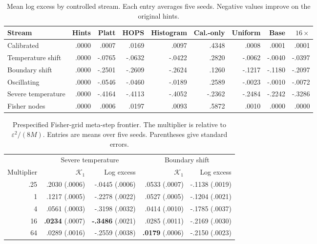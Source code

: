\documentclass{article}
\newcommand{\calK}{\mathcal{K}}
\begin{document}
\begin{table}[h]
\centering
\caption{Mean log excess by controlled stream. Each entry averages five
seeds. Negative values improve on the original hints.}
\label{tab:synthetic-excess-full}
\scriptsize
\begin{tabular}{lrrrrrrrr}
\toprule
Stream & Hints & Platt & HOPS & Histogram & Cal.-only & Uniform & Base & $16\times$\\
\midrule
Calibrated & .0000 & .0007 & .0169 & .0097 & .4348 & .0008 & .0001 & .0001\\
Temperature shift & .0000 & -.0765 & -.0632 & -.0422 & .2820 & -.0062 & -.0040 & -.0397\\
Boundary shift & .0000 & -.2501 & -.2609 & -.2624 & .1260 & -.1217 & -.1180 & -.2097\\
Oscillating & .0000 & -.0546 & -.0460 & -.0189 & .2589 & -.0023 & -.0010 & -.0072\\
Severe temperature & .0000 & -.4164 & -.4113 & -.4052 & -.2362 & -.2484 & -.2242 & -.3286\\
Fisher nodes & .0000 & .0006 & .0197 & .0093 & .5872 & .0010 & .0000 & .0000\\
\bottomrule
\end{tabular}
\end{table}

\begin{table}[h]
\centering
\caption{Prespecified Fisher-grid meta-step frontier. The multiplier is
relative to $\varepsilon^2/(8M)$. Entries are means over five seeds. Parentheses give standard errors.}
\label{tab:frontier}
\scriptsize
\begin{tabular}{rrrrr}
\toprule
& \multicolumn{2}{c}{Severe temperature}
& \multicolumn{2}{c}{Boundary shift}\\
\cmidrule(lr){2-3}\cmidrule(lr){4-5}
Multiplier & $\calK_1$ & Log excess & $\calK_1$ & Log excess\\
\midrule
.25 & .2030 (.0006) & -.0445 (.0006) & .0533 (.0007) & -.1138 (.0019)\\
1 & .1217 (.0005) & -.2278 (.0022) & .0527 (.0005) & -.1204 (.0021)\\
4 & .0561 (.0003) & -.3198 (.0032) & .0414 (.0010) & -.1785 (.0037)\\
16 & \textbf{.0234} (.0007) & \textbf{-.3486} (.0021)
& .0285 (.0011) & -.2169 (.0030)\\
64 & .0289 (.0016) & -.2559 (.0038)
& \textbf{.0179} (.0006) & -.2150 (.0023)\\
\bottomrule
\end{tabular}
\end{table}
\end{document}

